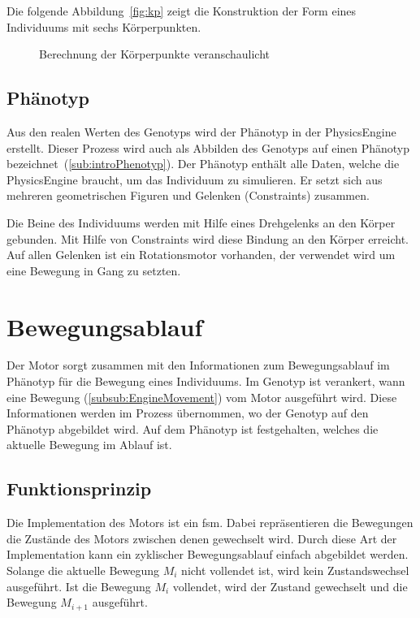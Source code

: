         \medskip

        Die folgende Abbildung~\vref{fig:kp} zeigt die Konstruktion der Form eines Individuums mit sechs Körperpunkten.

        \begin{figure}[H]
          \centering
          
          \caption{Berechnung der Körperpunkte veranschaulicht\label{fig:kp}}
        \end{figure}

    \subsection{Phänotyp\label{sub:Phenotyp}}

      Aus den realen Werten des Genotyps wird der Phänotyp in der \gls{PhysicsEngine} erstellt.
      Dieser Prozess wird auch als Abbilden des Genotyps auf einen Phänotyp bezeichnet~(\vref{sub:introPhenotyp}).
      Der Phänotyp enthält alle Daten, welche die \gls{PhysicsEngine} braucht, um das Individuum zu simulieren.
      Er setzt sich aus mehreren geometrischen Figuren und Gelenken (\Glspl{Constraint}) zusammen.

      \medskip

      Die Beine des Individuums werden mit Hilfe eines Drehgelenks an den Körper gebunden.
      Mit Hilfe von Constraints wird diese Bindung an den Körper erreicht.
      Auf allen Gelenken ist ein Rotationsmotor vorhanden, der verwendet wird um eine Bewegung in Gang zu setzten.

  \section{Bewegungsablauf\label{sec:Engine}}

    Der Motor sorgt zusammen mit den Informationen zum Bewegungsablauf im Phänotyp für die Bewegung eines Individuums.
    Im Genotyp ist verankert, wann eine Bewegung (\vref{subsub:EngineMovement}) vom Motor ausgeführt wird.
    Diese Informationen werden im Prozess übernommen, wo der Genotyp auf den Phänotyp abgebildet wird.
    Auf dem Phänotyp ist festgehalten, welches die aktuelle Bewegung im Ablauf ist.

    \subsection{Funktionsprinzip}

      Die Implementation des Motors ist ein \acrfull{fsm}.
      Dabei repräsentieren die Bewegungen die Zustände des Motors zwischen denen gewechselt wird.
      Durch diese Art der Implementation kann ein zyklischer Bewegungsablauf einfach abgebildet werden.
      \\
      Solange die aktuelle Bewegung \( M_{i} \) nicht vollendet ist, wird kein Zustandswechsel ausgeführt.
      Ist die Bewegung \( M_{i} \) vollendet, wird der Zustand gewechselt und die Bewegung \( M_{i + 1} \) ausgeführt.

